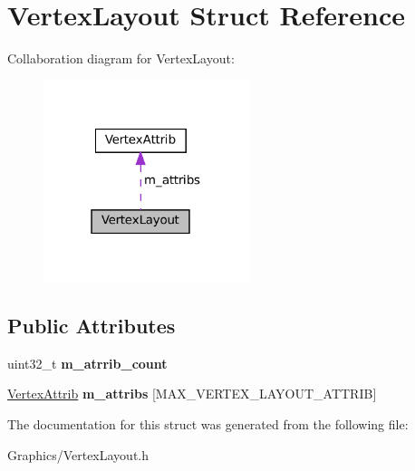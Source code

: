 \hypertarget{structVertexLayout}{}\section{Vertex\+Layout Struct Reference}
\label{structVertexLayout}


Collaboration diagram for Vertex\+Layout\+:\nopagebreak
\begin{figure}[H]
\begin{center}
\leavevmode
\includegraphics[width=171pt]{structVertexLayout__coll__graph}
\end{center}
\end{figure}
\subsection*{Public Attributes}
\begin{DoxyCompactItemize}
\item 
\mbox{\label{structVertexLayout_ae0167daf44dc0ca211722b381cf2131d}} 
uint32\+\_\+t {\bfseries m\+\_\+atrrib\+\_\+count}
\item 
\mbox{\label{structVertexLayout_a8b029eda23e9af78a9ef8d6eec5984e8}} 
\hyperlink{structVertexAttrib}{Vertex\+Attrib} {\bfseries m\+\_\+attribs} \mbox{[}M\+A\+X\+\_\+\+V\+E\+R\+T\+E\+X\+\_\+\+L\+A\+Y\+O\+U\+T\+\_\+\+A\+T\+T\+R\+IB\mbox{]}
\end{DoxyCompactItemize}


The documentation for this struct was generated from the following file\+:\begin{DoxyCompactItemize}
\item 
Graphics/Vertex\+Layout.\+h\end{DoxyCompactItemize}
